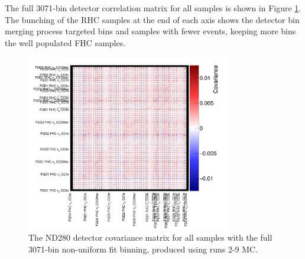 The full 3071-bin detector correlation matrix for all samples is shown in Figure \ref{fig:detcorrFitAll}. The bunching of the RHC samples at the end of each axis shows the detector bin merging process targeted bins and samples with fewer events, keeping more bins the well populated FHC samples.

\begin{figure}[!htbp]
\centering
\includegraphics*[width=0.8\textwidth,clip]{figs/detcovFit}
\caption{The ND280 detector covariance matrix for all samples with the full 3071-bin non-uniform fit binning, produced using runs 2-9 MC.}\label{fig:detcorrFitAll}
\end{figure}